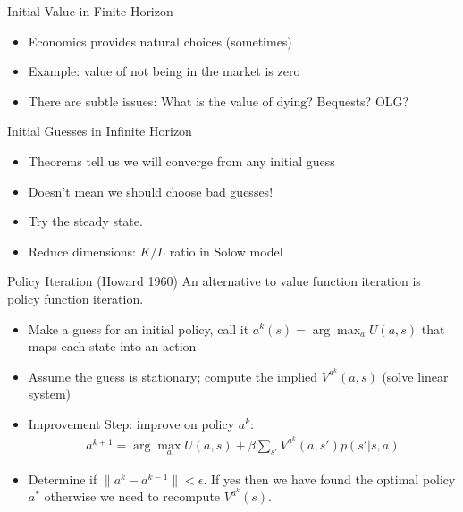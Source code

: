 \begin{frame}{Initial Value in Finite Horizon}
\begin{itemize}
\item Economics provides natural choices (sometimes)
\item Example: value of not being in the market is zero
\item There are subtle issues: What is the value of dying? Bequests? OLG?
\end{itemize}
\end{frame}

\begin{frame}{Initial Guesses in Infinite Horizon}
\begin{itemize}
\item Theorems tell us we will converge from any initial guess
\item Doesn't mean we should choose bad guesses!
\item Try the steady state.
\item Reduce dimensions:  $K/L$ ratio in Solow model
\end{itemize}
\end{frame}



\begin{frame}{Policy Iteration (Howard 1960)}
An alternative to value function iteration is policy function iteration. 
\begin{itemize}
\item Make a guess for an initial policy, call it $a^k(s) = \arg \max_a U(a,s)$ that maps each state into an action
\item Assume the guess is stationary;  compute the implied $V^{a^k}(a,s)$ (solve linear system)
\item Improvement Step: improve on policy $a^k$:
\begin{eqnarray*}
a^{k+1} = \arg \max_a U(a,s) + \beta \sum_{s'} V^{a^k}(a,s') p(s' | s,a)
\end{eqnarray*}
\item Determine if $\| a^k -a^{k-1}\| < \epsilon$. If yes then we have found the optimal policy $a^* $ otherwise we need to recompute $V^{a^k}(s)$.
\end{itemize}
\end{frame}

